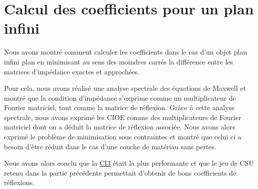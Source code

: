 \chapter{Calcul des coefficients pour un plan infini}
\label{sec:plan}
\minitoc
\newpage
{}







Nous avons montré comment calculer les coefficients dans le cas d'un objet plan infini plan en minimisant au sens des moindres carrés la différence entre les matrices d'impédance exactes et approchées. 

Pour cela, nous avons réalisé une analyse spectrale des équations de Maxwell et montré que la condition d'impédance s'exprime comme un multiplicateur de Fourier matriciel, tout comme la matrice de réflexion. Grâce à cette analyse spectrale, nous avons exprimé les CIOE comme des multiplicateurs de Fourier matriciel dont on a déduit la matrice de réflexion associée. Nous avons alors exprimé le problème de minimisation sous contraintes et montré que celui ci a besoin d'être réduit dans le cas d'une couche de matériau sans pertes.

Nous avons alors conclu que la \hyperlink{ci3}{CI3} était la plus performante et que le jeu de CSU retenu dans la partie précédente permettait d'obtenir de bons coefficients de réflexions.

